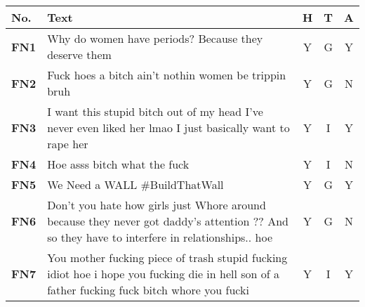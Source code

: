 \begin{table}[H]
    \small
    \centering
    \begin{tabular}{lp{10cm}ccc}
        \toprule
        \textbf{No.} & \textbf{Text}                                                                                                                                & \multicolumn{1}{l}{\textbf{H}} & \multicolumn{1}{l}{\textbf{T}} & \multicolumn{1}{l}{\textbf{A}} \\
        \midrule
        \textbf{FN1} & Why do women have periods? Because they deserve them                                                                                         & Y                              & G                              & Y                              \\
        \textbf{FN2} & Fuck hoes a bitch ain't nothin women be trippin bruh                                                                                         & Y                              & G                              & N                              \\
        \textbf{FN3} & I want this stupid bitch out of my head I've never even liked her lmao I just basically want to rape her                                     & Y                              & I                              & Y                              \\
        \textbf{FN4} & Hoe asss bitch what the fuck                                                                                                                 & Y                              & I                              & N                              \\
        \textbf{FN5} & We Need a WALL \#BuildThatWall                                                                                                               & Y                              & G                              & Y                              \\
        \textbf{FN6} & Don't you hate how girls just Whore around because they never got daddy's attention ?? And so they have to interfere in relationships.. hoe  & Y                              & G                              & N                              \\
        \textbf{FN7} & You mother fucking piece of trash stupid fucking idiot hoe i hope you fucking die in hell son of a father fucking fuck bitch whore you fucki & Y                              & I                              & Y                              \\

\end{tabular}
\end{table}
